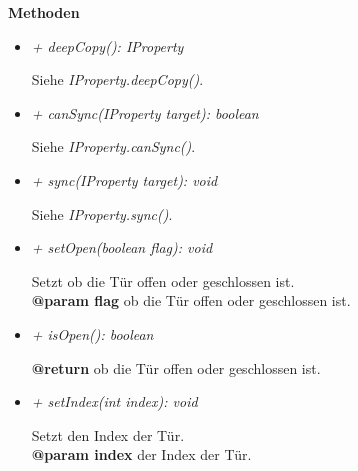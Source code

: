             \textbf{Methoden}
            \begin{itemize}
                \item \textit{+ deepCopy(): IProperty}
                    \begin{leftbar}[0.9\linewidth]
                        Siehe \textit{IProperty.deepCopy()}.
                    \end{leftbar}
                \item \textit{+ canSync(IProperty target): boolean}
                    \begin{leftbar}[0.9\linewidth]
                        Siehe \textit{IProperty.canSync()}.
                    \end{leftbar}
                \item \textit{+ sync(IProperty target): void}
                    \begin{leftbar}[0.9\linewidth]
                        Siehe \textit{IProperty.sync()}.
                    \end{leftbar}
                
                \pagebreak
                \item \textit{+ setOpen(boolean flag): void}
                    \begin{leftbar}[0.9\linewidth]
                        Setzt ob die Tür offen oder geschlossen ist.\\
                        \textbf{@param flag} ob die Tür offen oder geschlossen ist.
                    \end{leftbar}
                \item \textit{+ isOpen(): boolean}
                    \begin{leftbar}[0.9\linewidth]
                        \textbf{@return} ob die Tür offen oder geschlossen ist.
                    \end{leftbar}
                \item \textit{+ setIndex(int index): void}
                    \begin{leftbar}[0.9\linewidth]
                        Setzt den Index der Tür.\\
                        \textbf{@param index} der Index der Tür.
                    \end{leftbar}
            \end{itemize}